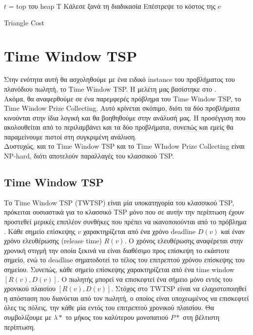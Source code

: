 \documentclass[oneside,12pt]{book}
\theoremstyle{definition}
\begin{document}
\begin{algorithm}[H]
	\SetAlgoLined
	
	\(t\) = top του heap T \;
	{Κάλεσε ξανά τη διαδικασία \;}
	Επέστρεψε το κόστος της e \;
	
	\caption{Triangle Cost}
\end{algorithm}

\section{Time Window TSP}

Στην ενότητα αυτή θα ασχοληθούμε με ένα ειδικό instance του προβλήματος του πλανόδιου πωλητή, το Time Window TSP. Η μελέτη μας βασίστηκε στο \cite{12}. \\

Ακόμα, θα αναφερθούμε σε ένα παρεμφερές πρόβλημα του Time Window TSP, το Time Window Prize Collecting. Αυτό κρίνεται σκόπιμο, διότι τα δύο προβλήματα κινούνται στην ίδια λογική και θα βοηθηθούμε στην ανάλυσή μας. Η προσέγγιση που ακολουθείται από το \cite{12} περιλαμβάνει και τα δύο προβλήματα, συνεπώς και εμείς θα παραμείνουμε πιστοί στη συγκριμένη ανάλυση. \\ 

Δυστυχώς, και το Time Window TSP και το Time WIndow Prize Collecting είναι NP-hard, διότι αποτελούν παραλλαγές του κλασσικού TSP. \\

\subsection{Time Window TSP} 

Το Time Window TSP (TWTSP) είναι μία υποκατηγορία του κλασσικού TSP, πρόκειται ουσιαστικά για το κλασσικό TSP μόνο που σε αυτήν την περίπτωση έχουν προστεθεί μερικές επιπλέον συνθήκες που πρέπει να ικανοποιούνται από το πρόβλημα . Κάθε σημείο επίσκεψης \(v\) χαρακτηρίζεται από ένα χρόνο deadline \(D(v)\) καί έναν χρόνο ελευθέρωσης (release time) \(R(v)\). Ο χρόνος ελευθέρωσης αναφέρεται στην χρονική στιγμή την οποία ξεκινά να είναι διαθέσιμο προς επίσκεψη το εκάστοτε σημείο, ενώ το deadline σηματοδοτεί το τέλος του επιτρεπτού χρόνου επίσκεψης του σημείου. Συνεπώς, κάθε σημείο επίσκεψης χαρακτηρίζεται από ένα time window \([R(v), D(v)]\). Ο πωλητής μπορεί να επισκεφτεί ένα σήμειο μόνο εντός του χρονικού πλαισίου \([R(v), D(v)]\). Στόχος στο TWTSP είναι να ελαχιστοποιηθεί η απόσταση που διανύεται από τον πωλητή, ο οποίος είναι υποχεωμένος να επισκεφτεί όλες τις πόλεις, την κάθε μία εντός του επιτρεπτού χρονικού πλαισίου. Θα συμβολίζουμε με \(λ*\) το μήκος του καλύτερου μονοπατιού \(P*\) στη βέλτιστη περίπτωση.  \\
\end{document}
